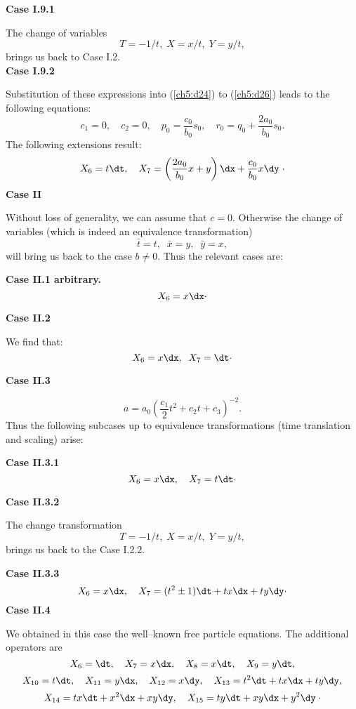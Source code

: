 {\bf Case I.9.1  }

The change of variables
\[T=-1/t,\;X=x/t,\;Y=y/t,\]
brings us back to Case I.2. \\

{\bf Case I.9.2  }

Substitution of these expressions into (\ref{ch5:d24}) to (\ref{ch5:d26}) leads
to the following equations:
\[c_1 = 0,\quad c_2=0,\quad p_0 = \frac{c_0}{b_0}s_0,\quad
r_0 = q_0+\frac{2a_0}{b_0}s_0.
\]
The following extensions result:
\[
X_6 = t\dt , \quad
X_7 = \left (\frac{2a_0}{b_0}x+y \right )\dx +\frac{c_0}{b_0}x\dy \;\cdot
\]
{\bf Case II }

Without loss of generality, we can assume that $c=0$. Otherwise the change
of variables (which is indeed an equivalence transformation)
\[\bar t= t,\;\;\bar x=y, \;\; \bar y= x, \]
will bring us back to the case $b\ne 0$. Thus the relevant cases are:


{\bf Case II.1   arbitrary.}
\[X_6 =x\dx\cdot \]

{\bf Case II.2   }

We find that:
\[X_6 = x\dx,\;\;X_7 = \dt \cdot \]

{\bf Case II.3   }

\[ a=a_0(\frac{c_1}{2}t^2+c_2t+c_3)^{-2}. \]
Thus the following subcases up to equivalence transformations
(time translation and scaling) arise:

{\bf Case II.3.1 }
\[ X_6 = x\dx ,\quad X_7  = t\dt \cdot \]

{\bf Case II.3.2  }

The change transformation
\[T=-1/t,\;X=x/t,\;Y=y/t,\]
brings us back to the Case I.2.2. 

{\bf Case II.3.3  }
\[ X_6 = x\dx ,\quad  X_7 = (t^2\pm 1)\dt +tx \dx +ty \dy \cdot \]
{\bf Case II.4 }

We obtained in this case the well--known free particle equations. The
additional operators are
\[X_6 = \dt,\quad X_7=x\dx ,\quad X_8 =x\dt, \quad X_9 =y\dt,\]
\[X_{10}=t\dt,\quad X_{11}=y\dx,\quad X_{12}=x\dy ,\quad
X_{13}= t^2\dt +tx \dx +ty \dy,\]
\[X_{14}=tx\dt +x^2 \dx +xy\dy,\quad X_{15}=ty\dt +xy \dx +y^2\dy\; \cdot\]
